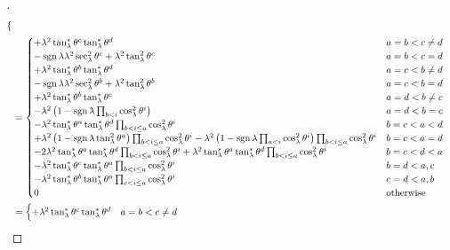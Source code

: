 \documentclass[../main.tex]{subfiles}
\begin{document}
\begin{proof}[]
\begin{align*}
\begin{cases}
\end{cases}\\
&=\begin{cases}
+\lambda^2\tan_\lambda^\ast\tensor{\theta}{^c}\tan_\lambda^\ast\tensor{\theta}{^d}
&\text{\(a=b<c\ne d\)}\\
-\sign{\lambda}\lambda^2\sec_\lambda^2\tensor{\theta}{^c}
+\lambda^2\tan_\lambda^2\tensor{\theta}{^c}
&\text{\(a=b<c=d\)}\\
+\lambda^2\tan_\lambda^\ast\tensor{\theta}{^b}\tan_\lambda^\ast\tensor{\theta}{^d}
&\text{\(a=c<b\ne d\)}\\
-\sign{\lambda}\lambda^2\sec^2_\lambda\tensor{\theta}{^b}
+\lambda^2\tan_\lambda^2\tensor{\theta}{^b}
&\text{\(a=c<b=d\)}\\
+\lambda^2\tan_\lambda^\ast\tensor{\theta}{^b}\tan_\lambda^\ast\tensor{\theta}{^c}
&\text{\(a=d<b\ne c\)}\\
-\lambda^2
\left(
1-\sign{\lambda}\prod_{b<i}\cos_\lambda^2\tensor{\theta}{^i}
\right)
&\text{\(a=d<b=c\)}\\
-\lambda^2\tan_\lambda^\ast\tensor{\theta}{^a}\tan_\lambda^\ast\tensor{\theta}{^d}\prod_{b<i\le a}\cos_\lambda^2\tensor{\theta}{^i}
&\text{\(b=c<a<d\)}\\
+\lambda^2\left(1-\sign{\lambda}\tan_\lambda^2\tensor{\theta}{^a}\right)\prod_{b<i\le a}{\cos_\lambda^2\tensor{\theta}{^i}}
-\lambda^2
\left(
1-\sign{\lambda}\prod_{a<i}\cos_\lambda^2\tensor{\theta}{^i}
\right)
\prod_{b<i\le a}\cos_\lambda^2\tensor{\theta}{^i}
&\text{\(b=c<a=d\)}\\
-2\lambda^2\tan_\lambda^\ast\tensor{\theta}{^a}\tan_\lambda^\ast\tensor{\theta}{^d}\prod_{b<i\le a}{\cos_\lambda^2\tensor{\theta}{^i}}
+\lambda^2\tan_\lambda^\ast\tensor{\theta}{^a}\tan_\lambda^\ast\tensor{\theta}{^d}\prod_{b<i\le a}\cos_\lambda^2\tensor{\theta}{^i}
&\text{\(b=c<d<a\)}\\
-\lambda^2\tan_\lambda^\ast\tensor{\theta}{^c}\tan_\lambda^\ast\tensor{\theta}{^a}\prod_{b<i\le a}\cos_\lambda^2\tensor{\theta}{^i}
&\text{\(b=d<a,c\)}\\
-\lambda^2\tan_\lambda^\ast\tensor{\theta}{^b}\tan_\lambda^\ast\tensor{\theta}{^a}\prod_{c<i\le a}\cos_\lambda^2\tensor{\theta}{^i}
&\text{\(c=d<a,b\)}\\
0&\text{otherwise}\\
\end{cases}\\
&=\begin{cases}
+\lambda^2\tan_\lambda^\ast\tensor{\theta}{^c}\tan_\lambda^\ast\tensor{\theta}{^d}
&\text{\(a=b<c\ne d\)}\\

\end{cases}
\end{align*}
\end{proof}
\end{document}
